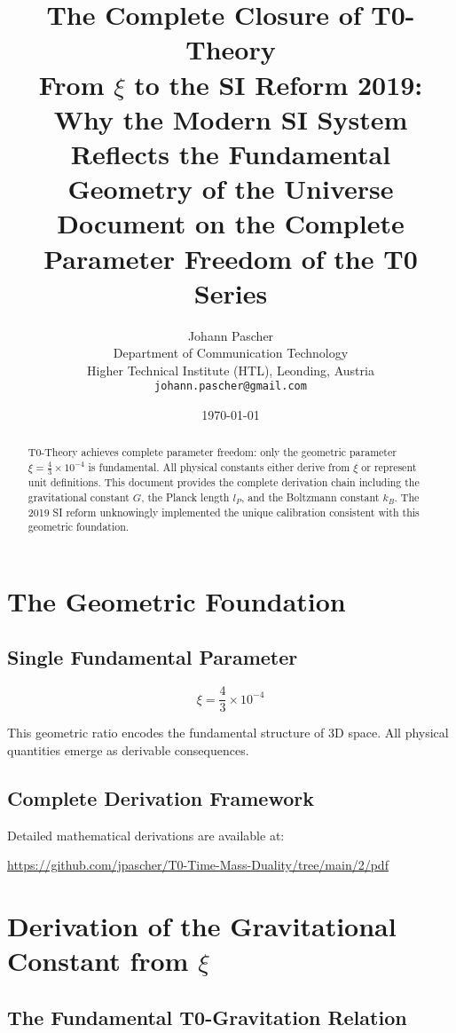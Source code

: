 \documentclass[12pt,a4paper]{article}
\title{\textbf{The Complete Closure of T0-Theory}\\[0.5cm]
	\large From $\xi$ to the SI Reform 2019:\\
	Why the Modern SI System Reflects the Fundamental Geometry of the Universe\\[0.3cm]
	\normalsize Document on the Complete Parameter Freedom of the T0 Series}
\author{Johann Pascher\\
	Department of Communication Technology\\
	Higher Technical Institute (HTL), Leonding, Austria\\
	\texttt{johann.pascher@gmail.com}}
\date{\today}
\begin{document}
	
	\maketitle
	
	\begin{abstract}
		T0-Theory achieves complete parameter freedom: only the geometric parameter $\xi = \frac{4}{3} \times 10^{-4}$ is fundamental. All physical constants either derive from $\xi$ or represent unit definitions. This document provides the complete derivation chain including the gravitational constant $G$, the Planck length $l_P$, and the Boltzmann constant $k_B$. The 2019 SI reform unknowingly implemented the unique calibration consistent with this geometric foundation.
	\end{abstract}
	
	\tableofcontents
	\newpage
	
	\section{The Geometric Foundation}
	
	\subsection{Single Fundamental Parameter}
	
	\begin{equation}
		\boxed{\xi = \frac{4}{3} \times 10^{-4}}
	\end{equation}
	
	This geometric ratio encodes the fundamental structure of 3D space. All physical quantities emerge as derivable consequences.
	
	\subsection{Complete Derivation Framework}
	
	Detailed mathematical derivations are available at:
	
	\begin{center}
		\url{https://github.com/jpascher/T0-Time-Mass-Duality/tree/main/2/pdf}
	\end{center}
	
	\section{Derivation of the Gravitational Constant from $\xi$}
	
	\subsection{The Fundamental T0-Gravitation Relation}
	
\end{document}
